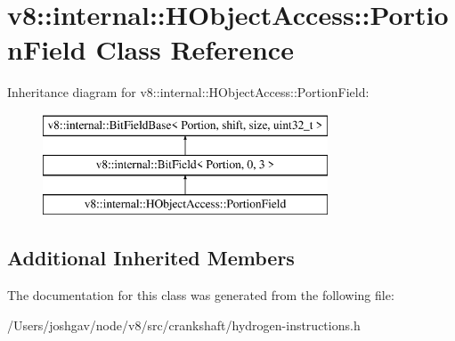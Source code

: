 \hypertarget{classv8_1_1internal_1_1_h_object_access_1_1_portion_field}{}\section{v8\+:\+:internal\+:\+:H\+Object\+Access\+:\+:Portion\+Field Class Reference}
\label{classv8_1_1internal_1_1_h_object_access_1_1_portion_field}
Inheritance diagram for v8\+:\+:internal\+:\+:H\+Object\+Access\+:\+:Portion\+Field\+:\begin{figure}[H]
\begin{center}
\leavevmode
\includegraphics[height=3.000000cm]{classv8_1_1internal_1_1_h_object_access_1_1_portion_field}
\end{center}
\end{figure}
\subsection*{Additional Inherited Members}


The documentation for this class was generated from the following file\+:\begin{DoxyCompactItemize}
\item 
/\+Users/joshgav/node/v8/src/crankshaft/hydrogen-\/instructions.\+h\end{DoxyCompactItemize}
